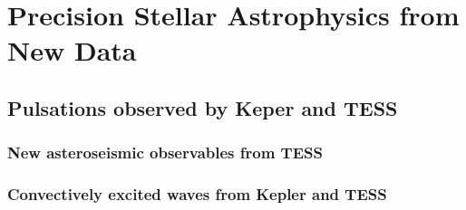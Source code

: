 \section{Precision Stellar Astrophysics from New Data}



{\color{blue}
\subsection{Pulsations observed by Keper and TESS}


\subsubsection{New asteroseismic observables from TESS}


\subsubsection{Convectively excited waves from Kepler and TESS}


}